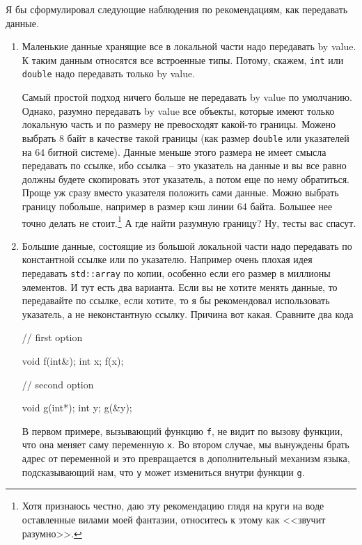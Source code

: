 \documentclass{article}
\begin{document}
Я бы сформулировал следующие наблюдения по рекомендациям, как передавать данные.
\begin{enumerate}
\item Маленькие данные хранящие все в локальной части надо передавать by value. К таким данным относятся все встроенные типы. Потому, скажем, \verb"int" или \verb"double" надо передавать только by value.

Самый простой подход ничего больше не передавать by value по умолчанию. Однако, разумно передавать by value все объекты, которые имеют только локальную часть и по размеру не превосходят какой-то границы. Можено выбрать 8 байт в качестве такой границы (как размер \verb"double" или указателей на 64 битной системе). Данные меньше этого размера не имеет смысла передавать по ссылке, ибо ссылка -- это указатель на данные и вы все равно должны будете скопировать этот указатель, а потом еще по нему обратиться. Проще уж сразу вместо указателя положить сами данные. Можно выбрать границу побольше, например в размер кэш линии 64 байта. Большее нее точно делать не стоит.\footnote{Хотя признаюсь честно, даю эту рекомендацию глядя на круги на воде оставленные вилами моей фантазии, относитесь к этому как <<звучит разумно>>.} А где найти разумную границу? Ну, тесты вас спасут.

\item Большие данные, состоящие из большой локальной части надо передавать по константной ссылке или по указателю. Например очень плохая идея передавать \verb"std::array" по копии, особенно если его размер в миллионы элементов. И тут есть два варианта. Если вы не хотите менять данные, то передавайте по ссылке, если хотите, то я бы рекомендовал использовать указатель, а не неконстантную ссылку. Причина вот какая. Сравните два кода
\begin{cppcode}
// first option

void f(int&);
int x;
f(x);

// second option

void g(int*);
int y;
g(&y);
\end{cppcode}
В первом примере, вызывающий функцию \verb"f", не видит по вызову функции, что она меняет саму переменную \verb"x". Во втором случае, мы вынуждены брать адрес от переменной и это превращается в дополнительный механизм языка, подсказывающий нам, что \verb"y" может измениться внутри функции \verb"g".



\end{enumerate}
\end{document}
